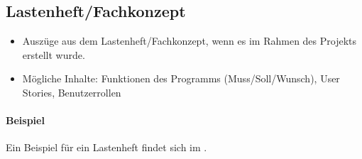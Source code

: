 

\subsection{Lastenheft/Fachkonzept}
\label{sec:Lastenheft}
\begin{itemize}
	\item Auszüge aus dem Lastenheft/Fachkonzept, wenn es im Rahmen des Projekts erstellt wurde.
	\item Mögliche Inhalte: Funktionen des Programms (Muss/Soll/Wunsch), User Stories, Benutzerrollen
\end{itemize}

\paragraph{Beispiel}
Ein Beispiel für ein Lastenheft findet sich im . 

